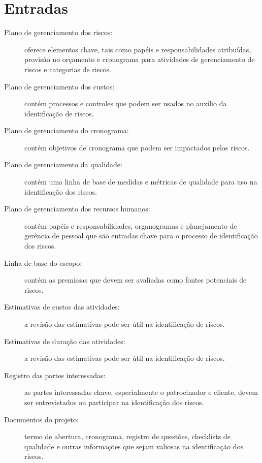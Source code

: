 \section{Entradas}

\begin{description}
	
	\item[Plano de gerenciamento dos riscos:] oferece elementos chave, tais como papéis e responsabilidades atribuídas, provisão no orçamento e cronograma para atividades de gerenciamento de riscos e categorias de riscos.
	
	\item[Plano de gerenciamento dos custos:] contém processos e controles que podem ser usados no auxílio da identificação de riscos.
	
	\item[Plano de gerenciamento do cronograma:] contém objetivos de cronograma que podem ser impactados pelos riscos.
	
	\item[Plano de gerenciamento da qualidade:] contém uma linha de base de medidas e métricas de qualidade para uso na identificação dos riscos.
	
	\item[Plano de gerenciamento dos recursos humanos:] contém papéis e responsabilidades, organogramas e planejamento de gerência de pessoal que são entradas chave para o processo de identificação dos riscos.
	
	\item[Linha de base do escopo:] contém as premissas que devem ser avaliadas como fontes potenciais de riscos.
	
	\item[Estimativas de custos das atividades:] a revisão das estimativas pode ser útil na identificação de riscos.
	
	\item[Estimativas de duração das atividades:] a revisão das estimativas pode ser útil na identificação de riscos.
	
	\item[Registro das partes interessadas:] as partes interessadas chave, especialmente o patrocinador e cliente, devem ser entrevistados ou participar na identificação dos riscos.
	
	\item[Documentos do projeto:] termo de abertura, cronograma, registro de questões, checklists de qualidade e outras informações que sejam valiosas na identificação dos riscos.
	

\end{description}
